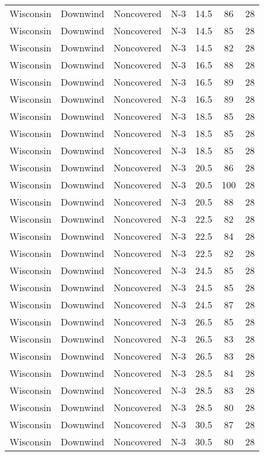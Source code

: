 \documentclass{article}
\begin{document}
\begin{longtable}[H]{ccccccc}
Wisconsin & Downwind & Noncovered & N-3 & 14.5 & 86  & 28 \\
Wisconsin & Downwind & Noncovered & N-3 & 14.5 & 85  & 28 \\
Wisconsin & Downwind & Noncovered & N-3 & 14.5 & 82  & 28 \\
Wisconsin & Downwind & Noncovered & N-3 & 16.5 & 88  & 28 \\
Wisconsin & Downwind & Noncovered & N-3 & 16.5 & 89  & 28 \\
Wisconsin & Downwind & Noncovered & N-3 & 16.5 & 89  & 28 \\
Wisconsin & Downwind & Noncovered & N-3 & 18.5 & 85  & 28 \\
Wisconsin & Downwind & Noncovered & N-3 & 18.5 & 85  & 28 \\
Wisconsin & Downwind & Noncovered & N-3 & 18.5 & 85  & 28 \\
Wisconsin & Downwind & Noncovered & N-3 & 20.5 & 86  & 28 \\
Wisconsin & Downwind & Noncovered & N-3 & 20.5 & 100 & 28 \\
Wisconsin & Downwind & Noncovered & N-3 & 20.5 & 88  & 28 \\
Wisconsin & Downwind & Noncovered & N-3 & 22.5 & 82  & 28 \\
Wisconsin & Downwind & Noncovered & N-3 & 22.5 & 84  & 28 \\
Wisconsin & Downwind & Noncovered & N-3 & 22.5 & 82  & 28 \\
Wisconsin & Downwind & Noncovered & N-3 & 24.5 & 85  & 28 \\
Wisconsin & Downwind & Noncovered & N-3 & 24.5 & 85  & 28 \\
Wisconsin & Downwind & Noncovered & N-3 & 24.5 & 87  & 28 \\
Wisconsin & Downwind & Noncovered & N-3 & 26.5 & 85  & 28 \\
Wisconsin & Downwind & Noncovered & N-3 & 26.5 & 83  & 28 \\
Wisconsin & Downwind & Noncovered & N-3 & 26.5 & 83  & 28 \\
Wisconsin & Downwind & Noncovered & N-3 & 28.5 & 84  & 28 \\
Wisconsin & Downwind & Noncovered & N-3 & 28.5 & 83  & 28 \\
Wisconsin & Downwind & Noncovered & N-3 & 28.5 & 80  & 28 \\
Wisconsin & Downwind & Noncovered & N-3 & 30.5 & 87  & 28 \\
Wisconsin & Downwind & Noncovered & N-3 & 30.5 & 80  & 28 \\

\end{longtable}
\end{document}
